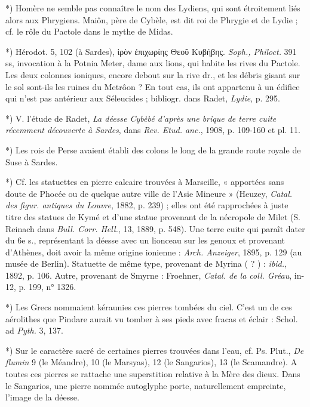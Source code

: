 \documentclass[a4paper, 11pt, oneside, polutonikogreek, french]{article}
\begin{document}
*) Homère ne semble pas connaître le nom des Lydiens, qui sont étroitement liés alors aux Phrygiens. Maiôn, père de Cybèle, est dit roi de Phrygie et de Lydie ; cf. le rôle du Pactole dans le mythe de Midas.

*) Hérodot. 5, 102 (à Sardes), ἱρὸν ἐπιχωρίης Θεοῦ Κυβήβης. \emph{Soph., Philoct.} 391 ss, invocation à la Potnia Meter, dame aux lions, qui habite les rives du Pactole. Les deux colonnes ioniques, encore debout sur la rive dr., et les débris gisant sur le sol sont-ils les ruines du Metrôon ? En tout cas, ils ont appartenu à un édifice qui n'est pas antérieur aux Séleucides ; bibliogr. dans Radet, \emph{Lydie}, p. 295.

*) V. l'étude de Radet, \emph{La déesse Cybèbé d'après une brique de terre cuite récemment découverte à Sardes}, dans \emph{Rev. Etud. anc.}, 1908, p. 109-160 et pl. 11.

*) Les rois de Perse avaient établi des colons le long de la grande route royale de Suse à Sardes.

*) Cf. les statuettes en pierre calcaire trouvées à Marseille, « apportées sans doute de Phocée ou de quelque autre ville de l'Asie Mineure » (Heuzey, \emph{Catal. des figur. antiques du Louvre}, 1882, p. 239) ; elles ont été rapprochées à juste titre des statues de Kymé et d'une statue provenant de la nécropole de Milet (S. Reinach dans \emph{Bull. Corr. Hell.}, 13, 1889, p. 548). Une terre cuite qui paraît dater du 6e s., représentant la déesse avec un lionceau sur les genoux et provenant d'Athènes, doit avoir la même origine ionienne : \emph{Arch. Anzeiger}, 1895, p. 129 (au musée de Berlin). Statuette de même type, provenant de Myrina ( ? ) : \emph{ibid.}, 1892, p. 106. Autre, provenant de Smyrne : Froehner, \emph{Catal. de la coll. Gréau}, in-12, p. 199, n° 1326.

*) Les Grecs nommaient kéraunies ces pierres tombées du ciel. C'est un de ces aérolithes que Pindare aurait vu tomber à ses pieds avec fracas et éclair : Schol. ad \emph{Pyth.} 3, 137.

*) Sur le caractère sacré de certaines pierres trouvées dans l'eau, cf. Ps. Plut., \emph{De flumin} 9 (le Méandre), 10 (le Marsyas), 12 (le Sangarios), 13 (le Scamandre). A toutes ces pierres se rattache une superstition relative à la Mère des dieux. Dans le Sangarios, une pierre nommée autoglyphe porte, naturellement empreinte, l'image de la déesse.
\end{document}
